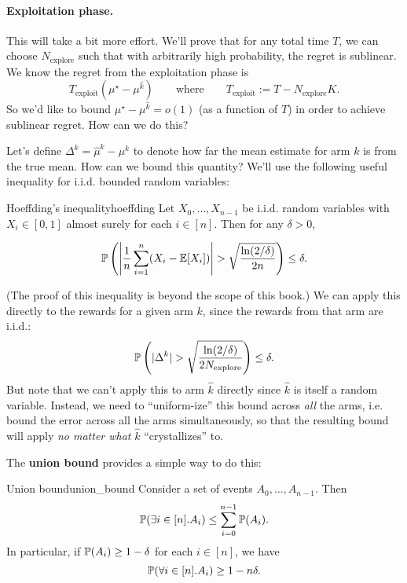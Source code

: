 \documentclass[\main/main]{subfiles}
\newcommand{\Nex}{N_{\text{explore}}}
\begin{document}
\paragraph*{Exploitation phase.} This will take a bit more effort. We'll prove that for any total time $T$, we can choose $\Nex$ such that with arbitrarily high probability, the regret is sublinear. We know the regret from the exploitation phase is
\[
    T_{\text{exploit}} (\mu^\star - \mu^{\hat k}) \qquad \text{where} \qquad T_{\text{exploit}} := T - \Nex K.
\]
So we'd like to bound $\mu^\star - \mu^{\hat k} = o(1)$ (as a function of $T$) in order to achieve sublinear regret. How can we do this?

Let's define $\Delta^k = \hat \mu^k - \mu^k$ to denote how far the mean estimate for arm $k$ is from the true mean. How can we bound this quantity? We'll use the following useful inequality for i.i.d. bounded random variables:

\begin{theorem}{Hoeffding's inequality}{hoeffding}
    Let $X_0, \dots, X_{n-1}$ be i.i.d. random variables with $X_i \in [0, 1]$ almost surely for each $i \in [n]$. Then for any $\delta > 0$,

    \begin{equation}
        \P\left( \left| \frac{1}{n} \sum_{i=1}^n (X_i - \E[X_i]) \right| > \sqrt{\frac{\ln(2/\delta)}{2n}} \right) \le \delta.
    \end{equation}
\end{theorem}

(The proof of this inequality is beyond the scope of this book.) We can apply this directly to the rewards for a given arm $k$, since the rewards from that arm are i.i.d.:
\begin{equation}
    \P\left(|\Delta^k | > \sqrt{\frac{\ln(2/\delta)}{2\Nex}} \right) \le \delta. \label{eq:hoeffding-etc}
\end{equation}
But note that we can't apply this to arm $\hat k$ directly since $\hat k$ is itself a random variable. Instead, we need to ``uniform-ize'' this bound across \emph{all} the arms, i.e. bound the error across all the arms simultaneously, so that the resulting bound will apply \emph{no matter what} $\hat k$ ``crystallizes'' to.

The \textbf{union bound} provides a simple way to do this:

\begin{theorem}{Union bound}{union_bound}
    Consider a set of events $A_0, \dots, A_{n-1}$. Then \[
        \P(\exists i \in [n]. A_i) \le \sum_{i=0}^{n-1} \P(A_i).
    \]
    In particular, if $\P(A_i) \ge 1 - \delta$ for each $i \in [n]$, we have \[
        \P(\forall i \in [n]. A_i) \ge 1 - n \delta.
    \]
\end{theorem}
\end{document}
